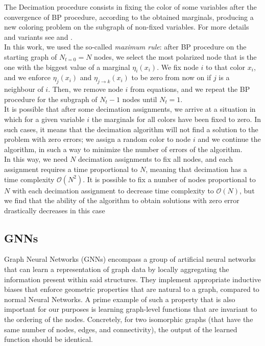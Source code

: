 \documentclass{article}
\begin{document}
The Decimation procedure consists in fixing the color of some variables after the convergence of BP procedure, according to the obtained marginals, producing a new coloring problem on the subgraph of non-fixed variables. For more details and variants see \cite{Krz_aka_a_2007} and \cite{DBLP:journals/corr/abs-0709-1667}.
\\In this work, we used the so-called \textit{maximum rule}: after BP procedure on the starting graph of $N_{t=0}=N$ nodes, we select the most polarized node that is the one with the biggest value of a marginal $\eta_i(x_i)$. We fix node $i$ to that color $x_i$, and we enforce $\eta_j (x_i)$ and $\eta_{j\rightarrow k}(x_i)$ to be zero from now on if $j$ is a neighbour of $i$. Then, we remove node $i$ from equations, and we repeat the BP procedure for the subgraph of $N_t-1$ nodes until $N_t=1$. 
\\It is possible that after some decimation assignments, we arrive at a situation in which for a given variable $i$ the marginals for all colors have been fixed to zero. In such cases, it means that the decimation algorithm will not find a solution to the problem with zero errors; we assign a random color to node $i$ and we continue the algorithm, in such a way to minimize the number of errors of the algorithm.
\\In this way, we need $N$ decimation assignments to fix all nodes, and each assignment requires a time proportional to $N$, meaning that decimation has a time complexity $\mathcal{O}(N^2)$. It is possible to fix a number of nodes proportional to $N$ with each decimation assignment to decrease time complexity to $\mathcal{O}(N)$, but we find that the ability of the algorithm to obtain solutions with zero error drastically decreases in this case



\subsection{GNNs} \label{sec:GNN}
Graph Neural Networks (GNNs) encompass a group of artificial neural networks that can learn a representation of graph data by locally aggregating the information present within said structures. They implement appropriate inductive biases that enforce geometric properties that are natural to a graph, compared to normal Neural Networks. A prime example of such a property that is also important for our purposes is learning graph-level functions that are invariant to the ordering of the nodes. Concretely, for two isomorphic graphs (that have the same number of nodes, edges, and connectivity), the output of the learned function should be identical.
\end{document}
